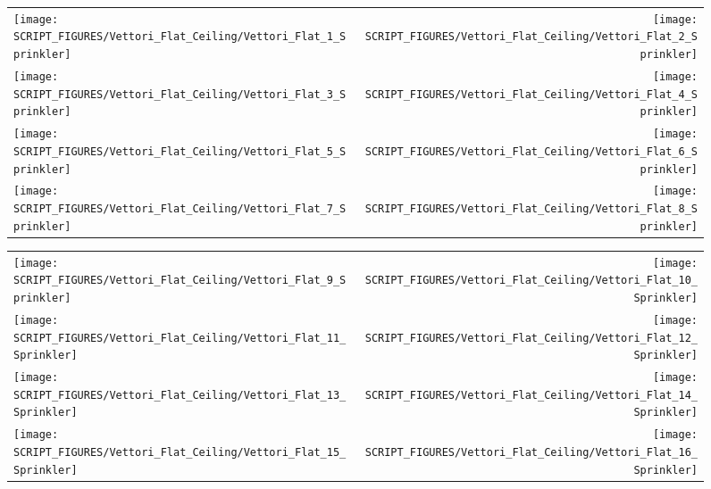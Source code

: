\begin{figure}[p]
\begin{tabular*}{\textwidth}{l@{\extracolsep{\fill}}r}
\texttt{[image: SCRIPT\_FIGURES/Vettori\_Flat\_Ceiling/Vettori\_Flat\_1\_Sprinkler]} &
\texttt{[image: SCRIPT\_FIGURES/Vettori\_Flat\_Ceiling/Vettori\_Flat\_2\_Sprinkler]} \\
\texttt{[image: SCRIPT\_FIGURES/Vettori\_Flat\_Ceiling/Vettori\_Flat\_3\_Sprinkler]} &
\texttt{[image: SCRIPT\_FIGURES/Vettori\_Flat\_Ceiling/Vettori\_Flat\_4\_Sprinkler]} \\
\texttt{[image: SCRIPT\_FIGURES/Vettori\_Flat\_Ceiling/Vettori\_Flat\_5\_Sprinkler]} &
\texttt{[image: SCRIPT\_FIGURES/Vettori\_Flat\_Ceiling/Vettori\_Flat\_6\_Sprinkler]} \\
\texttt{[image: SCRIPT\_FIGURES/Vettori\_Flat\_Ceiling/Vettori\_Flat\_7\_Sprinkler]} &
\texttt{[image: SCRIPT\_FIGURES/Vettori\_Flat\_Ceiling/Vettori\_Flat\_8\_Sprinkler]}
\end{tabular*}
\end{figure}

\begin{figure}[p]
\begin{tabular*}{\textwidth}{l@{\extracolsep{\fill}}r}
\texttt{[image: SCRIPT\_FIGURES/Vettori\_Flat\_Ceiling/Vettori\_Flat\_9\_Sprinkler]} &
\texttt{[image: SCRIPT\_FIGURES/Vettori\_Flat\_Ceiling/Vettori\_Flat\_10\_Sprinkler]} \\
\texttt{[image: SCRIPT\_FIGURES/Vettori\_Flat\_Ceiling/Vettori\_Flat\_11\_Sprinkler]} &
\texttt{[image: SCRIPT\_FIGURES/Vettori\_Flat\_Ceiling/Vettori\_Flat\_12\_Sprinkler]} \\
\texttt{[image: SCRIPT\_FIGURES/Vettori\_Flat\_Ceiling/Vettori\_Flat\_13\_Sprinkler]} &
\texttt{[image: SCRIPT\_FIGURES/Vettori\_Flat\_Ceiling/Vettori\_Flat\_14\_Sprinkler]} \\
\texttt{[image: SCRIPT\_FIGURES/Vettori\_Flat\_Ceiling/Vettori\_Flat\_15\_Sprinkler]} &
\texttt{[image: SCRIPT\_FIGURES/Vettori\_Flat\_Ceiling/Vettori\_Flat\_16\_Sprinkler]}
\end{tabular*}
\end{figure}

